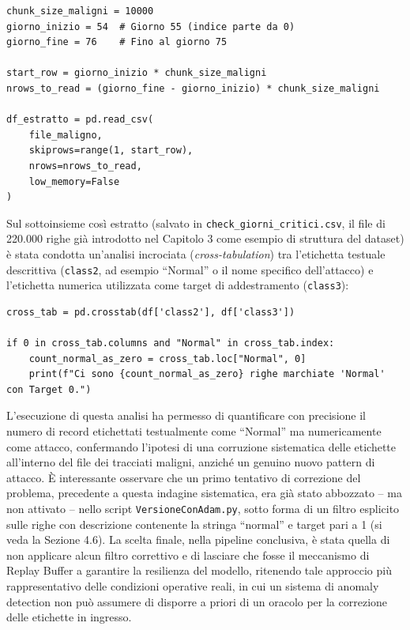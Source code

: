 \documentclass[12pt,a4paper]{report}
\begin{document}
\begin{lstlisting}[caption={Estrazione mirata delle righe corrispondenti ai giorni critici (\texttt{estrazioneRigheDataset.py})}]
chunk_size_maligni = 10000
giorno_inizio = 54  # Giorno 55 (indice parte da 0)
giorno_fine = 76    # Fino al giorno 75

start_row = giorno_inizio * chunk_size_maligni
nrows_to_read = (giorno_fine - giorno_inizio) * chunk_size_maligni

df_estratto = pd.read_csv(
    file_maligno,
    skiprows=range(1, start_row),
    nrows=nrows_to_read,
    low_memory=False
)
\end{lstlisting}

Sul sottoinsieme così estratto (salvato in \texttt{check\_giorni\_critici.csv}, il file di 220.000 righe già introdotto nel Capitolo 3 come esempio di struttura del dataset) è stata condotta un'analisi incrociata (\emph{cross-tabulation}) tra l'etichetta testuale descrittiva (\texttt{class2}, ad esempio ``Normal'' o il nome specifico dell'attacco) e l'etichetta numerica utilizzata come target di addestramento (\texttt{class3}):

\begin{lstlisting}[caption={Analisi incrociata tra etichetta testuale e numerica (\texttt{differenzeAttacchi.py})}]
cross_tab = pd.crosstab(df['class2'], df['class3'])

if 0 in cross_tab.columns and "Normal" in cross_tab.index:
    count_normal_as_zero = cross_tab.loc["Normal", 0]
    print(f"Ci sono {count_normal_as_zero} righe marchiate 'Normal' con Target 0.")
\end{lstlisting}

L'esecuzione di questa analisi ha permesso di quantificare con precisione il numero di record etichettati testualmente come ``Normal'' ma numericamente come attacco, confermando l'ipotesi di una corruzione sistematica delle etichette all'interno del file dei tracciati maligni, anziché un genuino nuovo pattern di attacco. È interessante osservare che un primo tentativo di correzione del problema, precedente a questa indagine sistematica, era già stato abbozzato -- ma non attivato -- nello script \texttt{VersioneConAdam.py}, sotto forma di un filtro esplicito sulle righe con descrizione contenente la stringa ``normal'' e target pari a 1 (si veda la Sezione 4.6). La scelta finale, nella pipeline conclusiva, è stata quella di non applicare alcun filtro correttivo e di lasciare che fosse il meccanismo di Replay Buffer a garantire la resilienza del modello, ritenendo tale approccio più rappresentativo delle condizioni operative reali, in cui un sistema di anomaly detection non può assumere di disporre a priori di un oracolo per la correzione delle etichette in ingresso.
\end{document}
